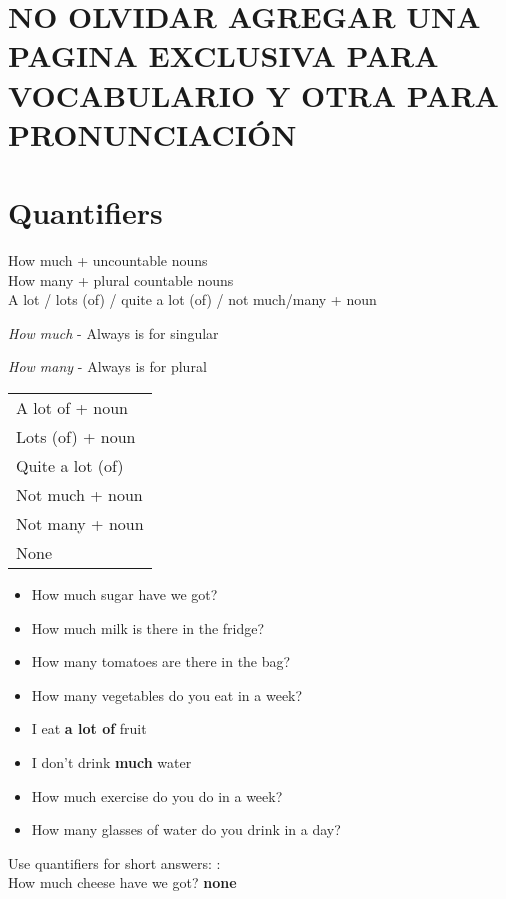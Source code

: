 \documentclass{elegantbook}
\begin{document}
        \section{NO OLVIDAR AGREGAR UNA PAGINA EXCLUSIVA PARA VOCABULARIO Y OTRA PARA PRONUNCIACIÓN}
        \section{Quantifiers}
        \begin{corollary}{}{}
            How much + uncountable nouns\\
            How many + plural countable nouns\\
            A lot / lots (of) / quite a lot (of) / not much/many + noun
        \end{corollary}
        \begin{property}
            \emph{How much} - Always is for singular
        \end{property}
        \begin{property}
            \emph{How many} - Always is for plural
        \end{property}
        \vspace{0.5em}
        \begin{tabular}{|l|}
            \hline
            A lot of + noun\\
            Lots (of) +  noun\\
            Quite a lot (of)\\
            Not much +  noun\\
            Not many + noun\\
            None\\
            \hline
        \end{tabular}
        \newpage
        \begin{example}
            \begin{itemize}
                \item How much sugar have we got?
                \item How much milk is there in the fridge?
                \item How many tomatoes are there in the bag?
                \item How many vegetables do you eat in a week?
                \item I eat \textbf{a lot of }fruit
                \item I don't drink \textbf{much} water
                \item How much exercise do you do in a week?
                \item How many glasses of water do you drink in a day?
            \end{itemize}
        \end{example}
        \begin{note}
            Use quantifiers for short answers: :\\
            How much cheese have we got? \textbf{none}
        \end{note}





        
\end{document}
